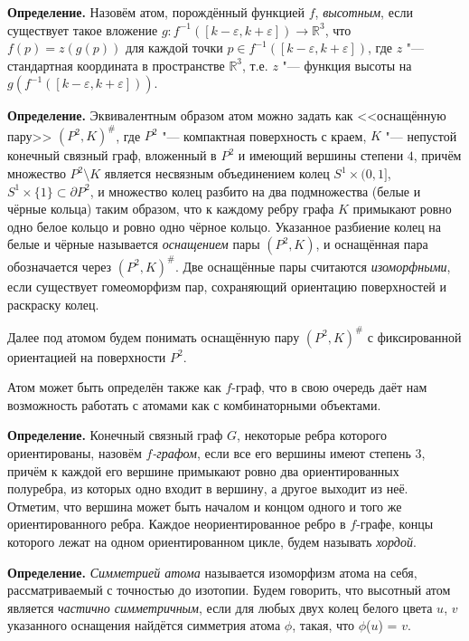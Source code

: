 \textbf{Определение. }
	Назовём атом, порождённый функцией $f$, {\em высотным}, если существует такое вложение $g
	\colon f^{-1}([k-\varepsilon, k+\varepsilon ]) \to \mathbb{R}^3$, что $f(p) = z(g(p))$ для каждой точки $p \in f^{-1}([k-\varepsilon, k+\varepsilon ])$, где $z$
	"--- стандартная координата в пространстве $\mathbb R^3$, т.е. $z$ "--- функция высоты на $g(f^{-1}([k-\varepsilon, k+\varepsilon ]))$.




\textbf{Определение.} Эквивалентным образом атом можно задать как <<оснащённую пару>> $(P^2, K)^\#$, где $P^2$ "--- компактная   поверхность с краем, $K$ "--- непустой конечный связный граф, вложенный в $P^2$ и имеющий вершины  степени $4$, причём множество $P^2 \setminus K$ является несвязным объединением колец $S^1 \times (0, 1]$, $ S^1 \times \{1\} \subset\partial P^2$, и множество колец разбито на два подмножества (белые и чёрные кольца) таким образом, что  к каждому ребру графа $K$ примыкают ровно одно белое кольцо и ровно одно чёрное кольцо. Указанное разбиение колец на белые и чёрные называется {\em  оснащением} пары $(P^2, K)$, и оснащённая пара обозначается через $(P^2, K)^\#$. Две оснащённые пары считаются {\em изоморфными}, если существует гомеоморфизм пар, сохраняющий ориентацию поверхностей и раскраску колец.


Далее под атомом будем понимать оснащённую пару $(P^2, K)^\#$ с фиксированной ориентацией на поверхности $P^2$.



Атом может быть определён также как $f$-граф, что в свою очередь даёт нам возможность работать с атомами как с комбинаторными объектами.



\textbf{Определение.} %
Конечный связный граф $G$, некоторые ребра которого ориентированы, назовём {\em
$f$-графом}, если все его вершины имеют степень $3$, причём к каждой его
вершине примыкают ровно два ориентированных полуребра, из которых одно входит в вершину,
а другое выходит из неё. Отметим, что вершина может быть началом и концом одного и того
же ориентированного ребра. Каждое неориентированное ребро в $f$-графе, концы которого лежат на одном ориентированном цикле, будем называть { \em хордой}.



{\bf Определение.}
	{\em Симметрией атома} называется изоморфизм атома на себя, рассматриваемый с точностью до изотопии. Будем говорить, что высотный атом является {\em частично симметричным}, если для любых двух колец белого цвета $u$, $v$ указанного оснащения найдётся симметрия атома $\phi $, такая, что $\phi$($u$) = $v$.



